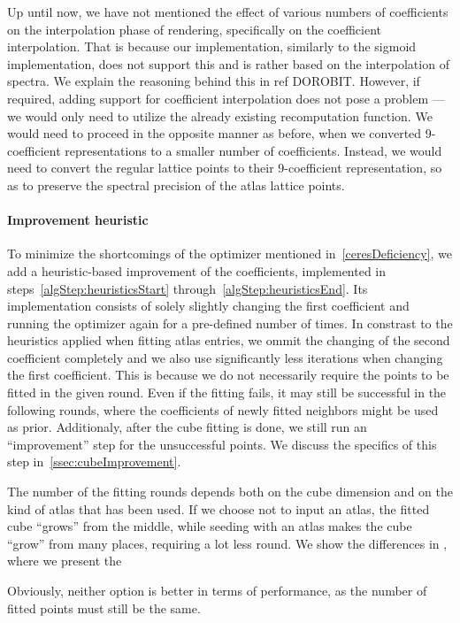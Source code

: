 Up until now, we have not mentioned the effect of various numbers of coefficients on the interpolation phase of rendering, specifically on the coefficient interpolation. That is because our implementation, similarly to the sigmoid implementation, does not support this and is rather based on the interpolation of spectra. We explain the reasoning behind this in ref DOROBIT. However, if required, adding support for coefficient interpolation does not pose a problem --- we would only need to utilize the already existing recomputation function. We would need to proceed in the opposite manner as before, when we converted 9-coefficient representations to a smaller number of coefficients. Instead, we would need to convert the regular lattice points to their 9-coefficient representation, so as to preserve the spectral precision of the atlas lattice points.

\paragraph{Improvement heuristic}

To minimize the shortcomings of the optimizer mentioned in~\cref{ceresDeficiency}, we add a heuristic-based improvement of the coefficients, implemented in steps~\ref{algStep:heuristicsStart} through~\ref{algStep:heuristicsEnd}. Its implementation consists of solely slightly changing the first coefficient and running the optimizer again for a pre-defined number of times. In constrast to the heuristics applied when fitting atlas entries, we ommit the changing of the second coefficient completely and we also use significantly less iterations when changing the first coefficient. This is because we do not necessarily require the points to be fitted in the given round. Even if the fitting fails, it may still be successful in the following rounds, where the coefficients of newly fitted neighbors might be used as prior. Additionaly, after the cube fitting is done, we still run an ``improvement'' step for the unsuccessful points. We discuss the specifics of this step in~\cref{ssec:cubeImprovement}.

The number of the fitting rounds depends both on the cube dimension and on the kind of atlas that has been used. If we choose not to input an atlas, the fitted cube ``grows'' from the middle, while seeding with an atlas makes the cube ``grow'' from many places, requiring a lot less round. We show the differences in , where we present the 

Obviously, neither option is better in terms of performance, as the number of fitted points must still be the same. 

